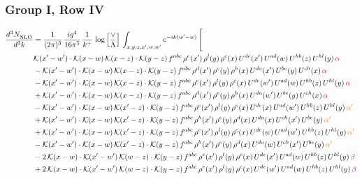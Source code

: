 \documentclass[9pt]{article}
\numberwithin{equation}{section}
\begin{document}
\subsubsection{Group I, Row IV}
\begin{align}
    \frac{d^{3}N_{\rm NLO}^{\rm}}{d^{3}k}  & = \frac{1}{(2\pi)^{3}}\, \frac{ig^{4}}{16\pi^{5}}\, \frac{1}{k^{+}}\, \log{\left[\frac{\vee}{\Lambda}\right]}\, \int_{x,y,z,x^{\prime},w,w^{\prime}}e^{-ik(w^{\prime}-w)}\, \Bigg[\notag \\ & \mathcal{K}(x'-w')\cdot \mathcal{K}(x-w)\,\mathcal{K}(x-z)\cdot \mathcal{K}(y-z)\,f^{abc}\, \rho^{e}(x')\, \rho^{l}(y)\,\rho^{c}(x)\, U^{de}(x')\,U^{ad}(w)\,U^{hb}(z)\,U^{hl}(y)\, {\color{red}\alpha}\notag \\ & -\mathcal{K}(x'-w')\cdot \mathcal{K}(x-w)\,\mathcal{K}(x-z)\cdot \mathcal{K}(y-z)\,f^{abc}\, \rho^{d}(x')\, \rho^{e}(y)\,\rho^{h}(x)\, U^{da}(x')\,U^{be}(y)\,U^{ch}(x)\,{\color{red} \alpha}\notag \\ & -\mathcal{K}(x'-w')\cdot \mathcal{K}(x-w)\,\mathcal{K}(x-z)\cdot \mathcal{K}(y-z)\,f^{abc}\, \rho^{e}(x')\, \rho^{l}(y)\,\rho^{c}(x)\, U^{de}(w')\,U^{ad}(w)\,U^{hb}(z)\,U^{hl}(y)\,{\color{red} \alpha}\notag\\ & +\mathcal{K}(x'-w')\cdot \mathcal{K}(x-w)\,\mathcal{K}(x-z)\cdot \mathcal{K}(y-z)\,f^{abc}\, \rho^{d}(x')\, \rho^{e}(y)\,\rho^{h}(x)\, U^{da}(w')\,U^{be}(y)\,U^{ch}(x)\,{\color{red} \alpha}\notag\\ &-\mathcal{K}(x'-w')\cdot\mathcal{K}(x-w)\,\mathcal{K}(x'-z)\cdot\mathcal{K}(y-z)\, f^{abc}\,\rho^{c}(x')\,\rho^{l}(y)\,\rho^{e}(x)\,U^{de}(x)\,U^{ad}(w')\,U^{hb}(z)\,U^{hl}(y)\,{\color{orange} \alpha'}\notag\\ & +\mathcal{K}(x'-w')\cdot\mathcal{K}(x-w)\,\mathcal{K}(x'-z)\cdot\mathcal{K}(y-z)\, f^{abc}\,\rho^{h}(x')\,\rho^{e}(y)\,\rho^{d}(x)\,U^{da}(x)\,U^{ch}(x')\,U^{be}(y)\,{\color{orange} \alpha'}\notag\\
&+\mathcal{K}(x'-w')\cdot\mathcal{K}(x-w)\,\mathcal{K}(x'-z)\cdot\mathcal{K}(y-z)\, f^{abc}\,\rho^{c}(x')\,\rho^{l}(y)\,\rho^{e}(x)\,U^{de}(w)\,U^{ad}(w')\,U^{hb}(z)\,U^{hl}(y)\,{\color{orange} \alpha'}\notag \\ &-\mathcal{K}(x'-w')\cdot\mathcal{K}(x-w)\,\mathcal{K}(x'-z)\cdot\mathcal{K}(y-z)\, f^{abc}\,\rho^{h}(x')\,\rho^{e}(y)\,\rho^{d}(x)\,U^{da}(w)\,U^{ch}(x')\,U^{be}(y)\,{\color{orange} \alpha'}\notag \\ &  -2\,\mathcal{K}(x-w)\cdot \mathcal{K}(x'-w')\, \mathcal{K}(w-z)\cdot \mathcal{K}(y-z)\, f^{abc}\,\rho^{e}(x')\,\rho^{l}(y)\,\rho^{c}(x)\, U^{de}(x')\,U^{ad}(w)\,U^{hb}(z)\,U^{hl}(y)\,{\color{violet} \beta}\notag\\ & +2\,\mathcal{K}(x-w)\cdot \mathcal{K}(x'-w')\, \mathcal{K}(w-z)\cdot \mathcal{K}(y-z)\, f^{abc}\,\rho^{e}(x')\,\rho^{l}(y)\,\rho^{c}(x)\, U^{de}(w')\,U^{ad}(w)\,U^{hb}(z)\,U^{hl}(y)\,{\color{violet} \beta}\notag\\

\end{align}
\end{document}
